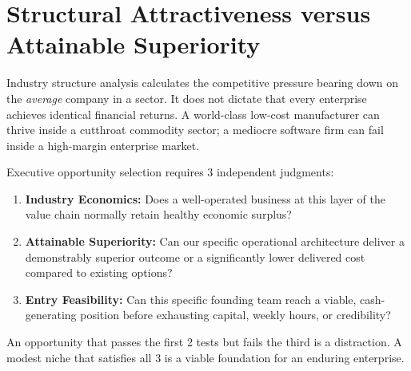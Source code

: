 \section{Structural Attractiveness versus Attainable Superiority}

Industry structure analysis calculates the competitive pressure bearing down on the \textit{average} company in a sector. It does not dictate that every enterprise achieves identical financial returns. A world-class low-cost manufacturer can thrive inside a cutthroat commodity sector; a mediocre software firm can fail inside a high-margin enterprise market.

Executive opportunity selection requires 3 independent judgments:
\begin{enumerate}[leftmargin=12pt,itemsep=2pt,topsep=1pt,parsep=0pt]
  \item \textbf{Industry Economics:} Does a well-operated business at this layer of the value chain normally retain healthy economic surplus?
  \item \textbf{Attainable Superiority:} Can our specific operational architecture deliver a demonstrably superior outcome or a significantly lower delivered cost compared to existing options?
  \item \textbf{Entry Feasibility:} Can this specific founding team reach a viable, cash-generating position before exhausting capital, weekly hours, or credibility?
\end{enumerate}

An opportunity that passes the first 2 tests but fails the third is a distraction. A modest niche that satisfies all 3 is a viable foundation for an enduring enterprise.

